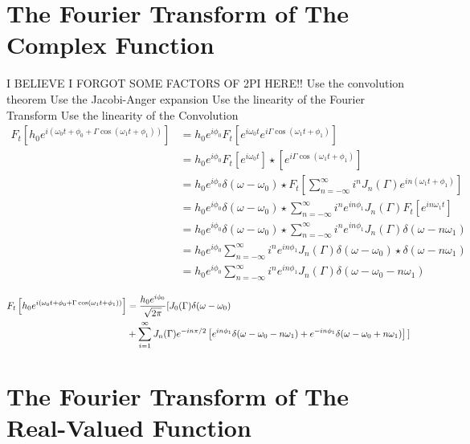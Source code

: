 \documentclass[twocolumn, groupedaddress]{revtex4-1}
\begin{document}
\section{The Fourier Transform of The Complex Function}
I BELIEVE I FORGOT SOME FACTORS OF 2PI HERE!!
Use the convolution theorem
Use the Jacobi-Anger expansion
Use the linearity of the Fourier Transform
Use the linearity of the Convolution
\begin{align}
F_t \left[ h_0 e^{i\left( \omega_0 t + \phi_0 + \Gamma \cos( \omega_1 t + \phi_1 ) \right)} \right]
&= h_0 e^{i\phi_0} F_t \left[ e^{i\omega_0 t} e^{i\Gamma \cos(\omega_1 t + \phi_1)} \right]													\\
&= h_0 e^{i\phi_0} F_t \left[ e^{i\omega_0 t} \right] \star \left[ e^{i\Gamma \cos(\omega_1 t + \phi_1)} \right]								\\
&= h_0 e^{i\phi_0} \delta(\omega - \omega_0) \star F_t \left[ \sum_{n=-\infty}^{\infty} i^n J_n(\Gamma) e^{in(\omega_1 t + \phi_1)} \right]		\\
&= h_0 e^{i\phi_0} \delta(\omega - \omega_0) \star \sum_{n=-\infty}^{\infty} i^n e^{in\phi_1} J_n(\Gamma) F_t \left[ e^{in\omega_1 t} \right]	\\
&= h_0 e^{i\phi_0} \delta(\omega - \omega_0) \star \sum_{n=-\infty}^{\infty} i^n e^{in\phi_1} J_n(\Gamma) \delta(\omega - n\omega_1)			\\
&= h_0 e^{i\phi_0} \sum_{n=-\infty}^{\infty} i^n e^{in\phi_1} J_n(\Gamma)  \delta(\omega - \omega_0) \star \delta(\omega - n\omega_1)			\\
&= h_0 e^{i\phi_0} \sum_{n=-\infty}^{\infty} i^n e^{in\phi_1} J_n(\Gamma)  \delta(\omega - \omega_0 - n\omega_1)
\end{align}


\begin{align}
F_t \left[ h_0 e^{i\left( \omega_0 t + \phi_0 + \Gamma \cos( \omega_1 t + \phi_1 ) \right)} \right] 			\nonumber
	&= \frac{h_0 e^{i\phi_0}}{\sqrt{2\pi}} \Huge{[} J_0(\Gamma) \delta(\omega - \omega_0) 					\\
	&+ \sum_{i=1}^{\infty} J_n(\Gamma) e^{-in\pi/2} 
	\left[ e^{in\phi_1} \delta(\omega - \omega_0 - n\omega_1) + e^{-in\phi_1} \delta(\omega - \omega_0 + n\omega_1) \right] \Huge{]}
\end{align}

\section{The Fourier Transform of The Real-Valued Function}
\end{document}
